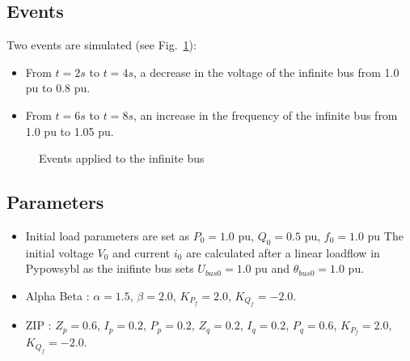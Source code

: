 \documentclass[a4paper, 12pt]{report}
\begin{document}
\subsection*{Events}
Two events are simulated (see Fig.~\ref{events}):
\begin{itemize}
\item From $t = 2s$ to $t = 4s$, a decrease in the voltage of the infinite bus from 1.0 pu to 0.8 pu.
\item From $t = 6s$ to $t = 8s$, an increase in the frequency of the infinite bus from 1.0 pu to 1.05 pu.
\end{itemize}
\begin{figure}[H]
\begin{center}
  \end{center}
  \caption{Events applied to the infinite bus\label{events}}
\end{figure}
\subsection*{Parameters}
\begin{itemize}
  \item Initial load parameters are set as $P_0 = 1.0$ pu, $Q_0 = 0.5$ pu, $f_0 = 1.0$ pu The initial voltage $V_0$ and current $i_0$ are calculated after a linear loadflow in Pypowsybl as the inifinte bus sets $U_{bus0} = 1.0$ pu and $\theta_{bus0} = 1.0$ pu.
  \item Alpha Beta : $\alpha = 1.5$, $\beta = 2.0$, $K_{P_f} = 2.0$, $K_{Q_f} = -2.0$.
  \item ZIP : $Z_{p} = 0.6$, $I_{p} = 0.2$, $P_{p} = 0.2$, $Z_{q} = 0.2$, $I_{q} = 0.2$, $P_{q} = 0.6$, $K_{P_f} = 2.0$, $K_{Q_f} = -2.0$.
\end{itemize}
\newpage
\end{document}
